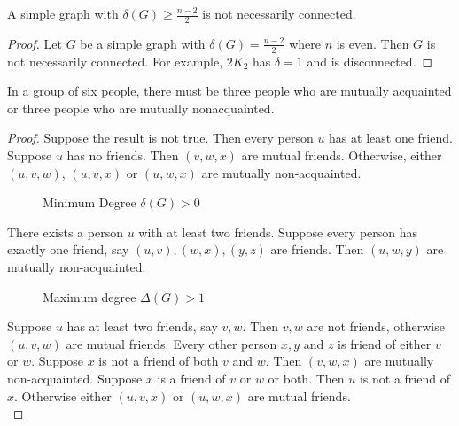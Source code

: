 \begin{exercise}
	A simple graph with $\delta(G) \ge \frac{n-2}{2}$ is not necessarily connected.
\end{exercise}
\begin{proof}
	Let $G$ be a simple graph with $\delta(G) = \frac{n-2}{2}$ where $n$ is even. Then $G$ is not necessarily connected. For example, $2K_2$ has $\delta = 1$ and is disconnected.
\end{proof}

\begin{exercise}
	In a group of six people, there must be three people who are mutually acquainted or three people who are mutually nonacquainted.
\end{exercise}
\begin{proof}
	Suppose the result is not true.
	Then every person $u$ has at least one friend. Suppose $u$ has no friends. Then $(v,w,x)$ are mutual friends. Otherwise, either $(u,v,w)$, $(u,v,x)$ or $(u,w,x)$ are mutually non-acquainted.\\
	
\begin{figure}[hbt]
\centering
{}
\caption{Minimum Degree $\delta(G) > 0$}
\end{figure}
	There exists a person $u$ with at least two friends. Suppose every person has exactly one friend, say $(u,v), (w,x), (y,z)$ are friends. Then $(u,w,y)$ are mutually non-acquainted.\\

\begin{figure}[hbt]
\centering
{}
\caption{Maximum degree $\Delta(G) > 1$}
\end{figure}
	Suppose $u$ has at least two friends, say $v,w$. Then $v,w$ are not friends, otherwise $(u,v,w)$ are mutual friends.
	Every other person $x,y$ and $z$ is friend of either $v$ or $w$. Suppose $x$ is not a friend of both $v$ and $w$. Then $(v,w,x)$ are mutually non-acquainted. Suppose $x$ is a friend of $v$ or $w$ or both. Then $u$ is not a friend of $x$. Otherwise either $(u,v,x)$ or $(u,w,x)$ are mutual friends.\\


\end{proof}
